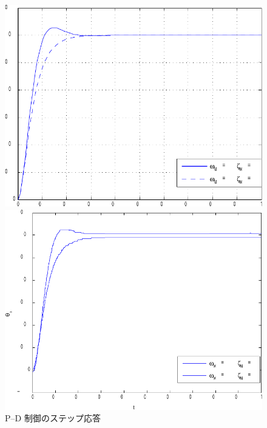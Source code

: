 \begin{figure}[H]
    \centering
    \begin{minipage}{0.48\linewidth}
        \centering
        \includegraphics[width=\linewidth]{figure/ex_pd_sim-crop.pdf}
    \end{minipage}
    \hfill
    \begin{minipage}{0.48\linewidth}
        \centering
        \includegraphics[width=\linewidth]{figure/ex_pd_hidari-crop.pdf}
    \end{minipage}
    \caption{P--D 制御のステップ応答}
    \label{fig:pd_response}
\end{figure}

